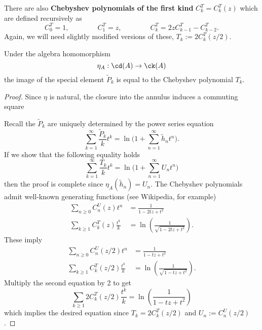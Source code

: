 There are also \textbf{Chebyshev polynomials of the first kind} $C^T_k = C^T_k(z)$ which are defined recursively as
\[
C^T_0 = 1, \qquad \qquad C^T_1 = z, \qquad \qquad C^T_k = 2 z C^T_{k-1} - C^T_{k-2}.
\]
Again, we will need slightly modified versions of these, $T_k := 2C^T_k(z/2)$.  

\begin{corollary}
Under the algebra homomorphism
\[
\eta_A: \cd(A) \to \ck(A)
\]
the image of the special element $\widetilde{P}_k$ is equal to the Chebyshev polynomial $T_k$.
\end{corollary}
\begin{proof}
Since $\eta$ is natural, the closure into the annulus induces a commuting square
\begin{center}
\end{center}
Recall the $\widetilde{P}_k$ are uniquely determined by the power series equation
\[
\sum_{k=1}^\infty \frac{\widetilde{P}_k}{k} t^k = \ln \Bigg( 1 + \sum_{n=1}^\infty \tilde{h}_n t^n \Bigg).
\]
If we show that the following equality holds
\[
\sum_{k=1}^\infty \frac{T_k}{k} t^k = \ln \Bigg( 1 + \sum_{n=1}^\infty U_n t^n \Bigg)
\]
then the proof is complete since $\eta_A(\tilde{h}_n)=U_n$. The Chebyshev polynomials admit well-known generating functions (see Wikipedia, for example)
\begin{align*}
\sum_{n \geq 0} C_n^U(z)t^n &= \frac{1}{1-2tz+t^2} \\
\sum_{k \geq 1} C_k^T(z)\frac{t^k}{k} &= \ln \left( \frac{1}{\sqrt{1-2tz+t^2}} \right).
\end{align*}
These imply
\begin{align*}
\sum_{n \geq 0} C_n^U(z/2)t^n &= \frac{1}{1-tz+t^2} \\
\sum_{k \geq 1} C_k^T(z/2)\frac{t^k}{k} &= \ln \left( \frac{1}{\sqrt{1-tz+t^2}} \right).
\end{align*}
Multiply the second equation by 2 to get
\[
\sum_{k \geq 1} 2C_k^T(z/2)\frac{t^k}{k} = \ln \left( \frac{1}{1-tz+t^2} \right)
\]
which implies the desired equation since $T_k = 2C_k^T(z/2)$ and $U_n := C_n^U(z/2)$.
\end{proof}

